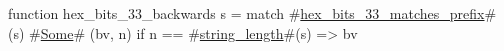 function hex_bits_33_backwards s =
  match #\hyperref[sailRISCVzhexzybitszy33zymatcheszyprefix]{hex\_bits\_33\_matches\_prefix}#(s) {
      #\hyperref[sailRISCVzSome]{Some}# (bv, n) if n == #\hyperref[sailRISCVzstringzylength]{string\_length}#(s) => bv
  }
